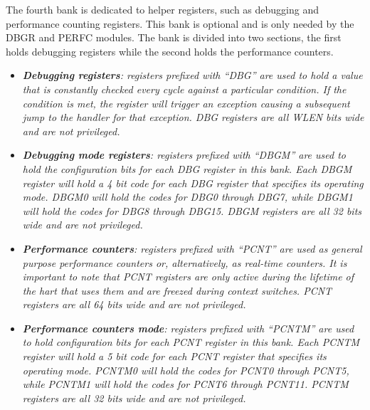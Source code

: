             \vspace{10pt}

            The fourth bank is dedicated to helper registers, such as debugging and performance counting registers. This bank is optional and is only needed by the DBGR and PERFC modules. The bank is divided into two sections, the first holds debugging registers while the second holds the performance counters.

            \begin{itemize}

                \item \textit{\textbf{Debugging registers}: registers prefixed with ``DBG'' are used to hold a value that is constantly checked every cycle against a particular condition. If the condition is met, the register will trigger an exception causing a subsequent jump to the handler for that exception. DBG registers are all WLEN bits wide and are not privileged.}

                \item \textit{\textbf{Debugging mode registers}: registers prefixed with ``DBGM'' are used to hold the configuration bits for each DBG register in this bank. Each DBGM register will hold a 4 bit code for each DBG register that specifies its operating mode. DBGM0 will hold the codes for DBG0 through DBG7, while DBGM1 will hold the codes for DBG8 through DBG15. DBGM registers are all 32 bits wide and are not privileged.}

                \item \textit{\textbf{Performance counters}: registers prefixed with ``PCNT'' are used as general purpose performance counters or, alternatively, as real-time counters. It is important to note that PCNT registers are only active during the lifetime of the hart that uses them and are freezed during context switches. PCNT registers are all 64 bits wide and are not privileged.}

                \item \textit{\textbf{Performance counters mode}: registers prefixed with ``PCNTM'' are used to hold configuration bits for each PCNT register in this bank. Each PCNTM register will hold a 5 bit code for each PCNT register that specifies its operating mode. PCNTM0 will hold the codes for PCNT0 through PCNT5, while PCNTM1 will hold the codes for PCNT6 through PCNT11. PCNTM registers are all 32 bits wide and are not privileged.}

            \end{itemize}

